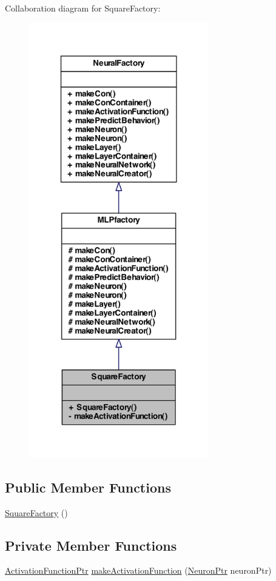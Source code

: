 Collaboration diagram for SquareFactory:\nopagebreak
\begin{figure}[H]
\begin{center}
\leavevmode
\includegraphics[width=222pt]{class_square_factory__coll__graph}
\end{center}
\end{figure}
\subsection*{Public Member Functions}
\begin{DoxyCompactItemize}
\item 
\hyperlink{class_square_factory_a4b4383a3bbd89da3a986067cb0636449}{SquareFactory} ()
\end{DoxyCompactItemize}
\subsection*{Private Member Functions}
\begin{DoxyCompactItemize}
\item 
\hyperlink{_a_m_o_r_e_8h_a77602a0277a02e5769c3df0adc669b17}{ActivationFunctionPtr} \hyperlink{class_square_factory_a1fe378c014b3713865f88c49e96ba938}{makeActivationFunction} (\hyperlink{_a_m_o_r_e_8h_ac1ea936c2c7728eb382278131652fef4}{NeuronPtr} neuronPtr)
\end{DoxyCompactItemize}


